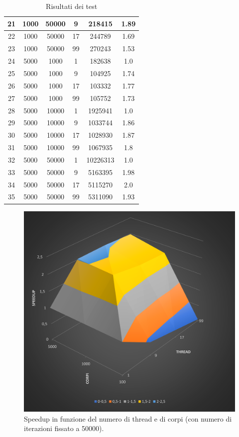 \documentclass[12pt,a4paper,openright,twoside]{book}
\begin{document}
\begin{table}[h!]
\begin{tabular}{ |c|c|c|c|c|c| }
		\hline
		21 & 1000 & 50000 & 9 & 218415 & 1.89 \\ 
		\hline
		22 & 1000 & 50000 & 17 & 244789 & 1.69 \\ 
		\hline
		23 & 1000 & 50000 & 99 & 270243 & 1.53 \\ 
		\hline
		24 & 5000 & 1000 & 1 & 182638 & 1.0 \\ 
		\hline
		25 & 5000 & 1000 & 9 & 104925 & 1.74 \\ 
		\hline
		26 & 5000 & 1000 & 17 & 103332 & 1.77 \\ 
		\hline
		27 & 5000 & 1000 & 99 & 105752 & 1.73 \\ 
		\hline
		28 & 5000 & 10000 & 1 & 1925941 & 1.0 \\ 
		\hline
		29 & 5000 & 10000 & 9 & 1033744 & 1.86 \\ 
		\hline
		30 & 5000 & 10000 & 17 & 1028930 & 1.87 \\ 
		\hline
		31 & 5000 & 10000 & 99 & 1067935 & 1.8 \\ 
		\hline
		32 & 5000 & 50000 & 1 & 10226313 & 1.0 \\ 
		\hline
		33 & 5000 & 50000 & 9 & 5163395 & 1.98 \\ 
		\hline
		34 & 5000 & 50000 & 17 & 5115270 & 2.0 \\ 
		\hline
		35 & 5000 & 50000 & 99 & 5311090 & 1.93 \\ 
		\hline
	\end{tabular}
	\caption{Risultati dei test}
	\label{tab:table1}
\end{table}

\begin{figure}
	\centering
	\includegraphics[width=\linewidth]{figures/speedup-plot.png}
	\caption{Speedup in funzione del numero di thread e di corpi (con numero di iterazioni fissato a 50000).}
	\label{fig:speedup}
\end{figure}
\end{document}
